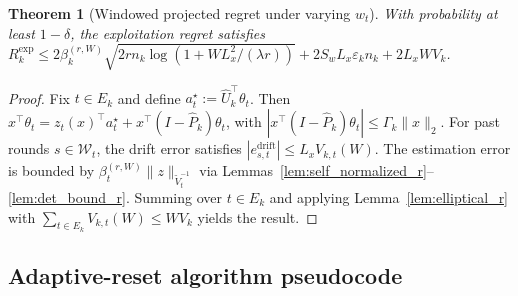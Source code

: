 \documentclass{article}
\newtheorem{theorem}{Theorem}
\begin{document}
\begin{theorem}[Windowed projected regret under varying $w_t$]
\label{thm:windowed_projected_varying}
With probability at least $1-\delta$, the exploitation regret satisfies
$R_k^{\mathrm{exp}} \le 2\beta_k^{(r,W)} \sqrt{2rn_k\log(1+WL_x^2/(\lambda r))} + 2S_wL_x\varepsilon_k n_k + 2L_x W V_k$.
\end{theorem}

\begin{proof}
Fix $t\in E_k$ and define $a_t^\star := \widehat U_k^\top \theta_t$.
Then $x^\top \theta_t = z_t(x)^\top a_t^\star + x^\top(I-\widehat P_k)\theta_t$, with $|x^\top(I-\widehat P_k)\theta_t| \le \Gamma_k\|x\|_2$.
For past rounds $s\in\mathcal W_t$, the drift error satisfies $|e_{s,t}^{\mathrm{drift}}| \le L_xV_{k,t}(W)$.
The estimation error is bounded by $\beta_t^{(r,W)}\|z\|_{\widetilde V_t^{-1}}$ via Lemmas~\ref{lem:self_normalized_r}--\ref{lem:det_bound_r}.
Summing over $t\in E_k$ and applying Lemma~\ref{lem:elliptical_r} with $\sum_{t\in E_k} V_{k,t}(W) \le W V_k$ yields the result.
\end{proof}

\subsection{Adaptive-reset algorithm pseudocode}
\label{app:adaptive_pseudocode}
\end{document}

